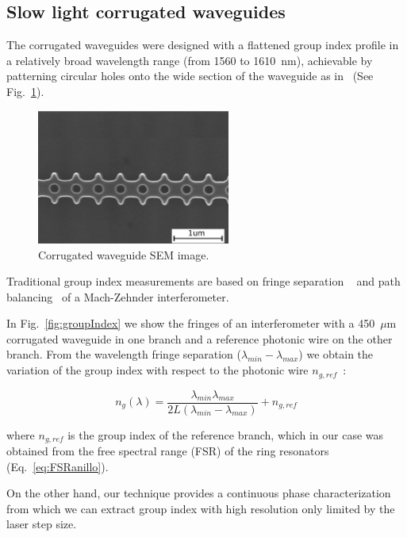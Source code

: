 \documentclass[journal]{IEEEtran}
\begin{document}
\subsection{Slow light corrugated waveguides}
\label{sec:corrWaveguides}
The corrugated waveguides were designed with a flattened group index profile in a relatively broad wavelength range (from 1560 to 1610~nm), achievable by patterning circular holes onto the wide section of the waveguide as in~\cite{Brimont2010} (See Fig.~\ref{fig:sem}).


\begin{figure}[htb]
	\centering
	\includegraphics[width=2.5in]{corrTEscale}	
	\caption{Corrugated waveguide SEM image.}
	\label{fig:sem}
 \end{figure}



Traditional group index measurements are based on fringe separation ~\cite{shang81,vlasov:05,yao:811,Dulkeith2006} and path balancing~\cite{Cohen:82,Knox:88,Liang:98} of a Mach-Zehnder interferometer.



In Fig.~\ref{fig:groupIndex} we show the fringes of an interferometer with a 450~$\mu$m corrugated waveguide in one branch and a reference photonic wire on the other branch. From the wavelength fringe separation ($ \lambda_{min} - \lambda_{max} $) we obtain the variation of the group index with respect to the photonic wire $ n_{g,ref} $~\cite{vlasov:05}:


\begin{equation}
  n_g (\lambda)=\frac{\lambda_{min} \lambda_{max}}{ 2L (\lambda_{min} - \lambda_{max})} + n_{g,ref}
\end{equation}


where $n_{g,ref}$ is the group index of the reference branch, which in our case was obtained from the free spectral range (FSR) of the ring resonators (Eq.~\ref{eq:FSRanillo}).  %


On the other hand, our technique provides a continuous phase characterization from which we can extract group index with high resolution only limited by the laser step size.
\end{document}
